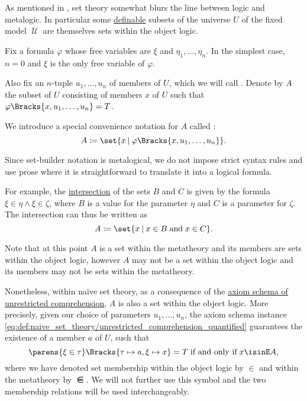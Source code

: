 \begin{definition}\label{def:set_builder_notation}
  As mentioned in , set theory somewhat blurs the line between logic and metalogic. In particular some \hyperref[def:first_order_definability]{definable} subsets of the universe \( U \) of the fixed model \( \mscrU \) are themselves sets within the object logic.

  Fix a formula \( \varphi \) whose free variables are \( \xi \) and \( \eta_1, \ldots, \eta_n \). In the simplest case, \( n = 0 \) and \( \xi \) is the only free variable of \( \varphi \).

  Also fix an \( n \)-tuple \( u_1, \ldots, u_n \) of members of \( U \), which we will call . Denote by \( A \) the subset of \( U \) consisting of members \( x \) of \( U \) such that \( \varphi\Bracks{x, u_1, \ldots, u_n} = T \).

  We introduce a special convenience notation for \( A \) called :
  \begin{equation*}
    A \coloneqq \set{ x \given \varphi\Bracks{x, u_1, \ldots, u_n} }.
  \end{equation*}

  Since set-builder notation is metalogical, we do not impose strict syntax rules and use prose where it is straightforward to translate it into a logical formula.

  For example, the \hyperref[def:basic_set_operations/intersection]{intersection} of the sets \( B \) and \( C \) is given by the formula \( \xi \in \eta \wedge \xi \in \zeta \), where \( B \) is a value for the parameter \( \eta \) and \( C \) is a parameter for \( \zeta \). The intersection can thus be written as
  \begin{equation*}
    A \coloneqq \set{ x \given x \in B \T{and} x \in C }.
  \end{equation*}

  Note that at this point \( A \) is a set within the metatheory and its members are sets within the object logic, however \( A \) may not be a set within the object logic and its members may not be sets within the metatheory.

  Nonetheless, within na\"ive set theory, as a consequence of the \hyperref[def:naive_set_theory/unrestricted_comprehension]{axiom schema of unrestricted comprehension}, \( A \) is also a set within the object logic. More precisely, given our choice of parameters \( u_1, \ldots, u_n \), the axiom schema instance \eqref{eq:def:naive_set_theory/unrestricted_comprehension_quantified} guarantees the existence of a member \( a \) of \( U \), such that
  \begin{equation*}
    \parens{ \xi \in \tau }\Bracks{ \tau \mapsto a, \xi \mapsto x } = T
    \T{if and only if}
    x \isinE A,
  \end{equation*}
  where we have denoted set membership within the object logic by \( \in \) and within the metatheory by \( \isinE \). We will not further use this symbol and the two membership relations will be used interchangeably.


\end{definition}
